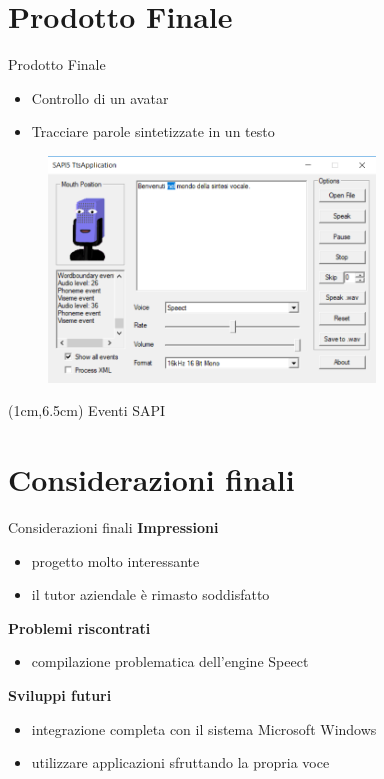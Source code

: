 \documentclass{beamer}
\begin{document}
\section{Prodotto Finale}
\begin{frame}{Prodotto Finale}
	\begin{itemize}
	 \item Controllo di un avatar 
	 \item Tracciare parole sintetizzate in un testo
	\end{itemize}
	\begin{figure}[H]
		\includegraphics[height=6cm]{images/prodotto-finale-3}
	\end{figure}
	\begin{textblock*}{1cm}(1cm,6.5cm) %
		Eventi SAPI
	\end{textblock*}
	
\end{frame}

\section{Considerazioni finali}
\begin{frame}{Considerazioni finali}
	\textbf{Impressioni}
	\begin{itemize}
		\item progetto molto interessante
		\item il tutor aziendale è rimasto soddisfatto
	\end{itemize}
	\vspace{10pt}
	\textbf{Problemi riscontrati}
	\begin{itemize}
		\item compilazione problematica dell'engine Speect 
	\end{itemize}
    \vspace{10pt}
	\textbf{Sviluppi futuri}
	\begin{itemize}
		\item integrazione completa con il sistema Microsoft Windows
		\item utilizzare applicazioni sfruttando la propria voce
	\end{itemize}
\end{frame}

	

	
\end{document}
